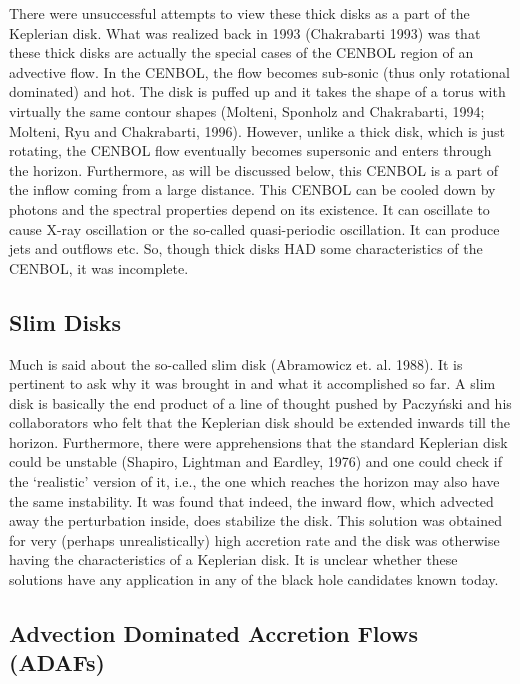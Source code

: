 \documentclass{ws-procs975x65}
\begin{document}
There were unsuccessful attempts to view these thick disks as a part of the Keplerian disk. What was realized
back in 1993 (Chakrabarti 1993) was that these thick disks are actually the special cases of the 
CENBOL region of an advective flow. In the CENBOL, the flow becomes sub-sonic (thus only
rotational dominated) and hot. 
The disk is puffed up and it takes the shape of a torus with virtually the same contour 
shapes (Molteni, Sponholz and Chakrabarti, 1994; Molteni, Ryu and Chakrabarti, 1996). 
However, unlike a thick disk, which is just rotating, the CENBOL flow
eventually becomes supersonic and enters through the horizon.  Furthermore, as will be discussed below,
this CENBOL is a part of the inflow coming from a large distance. This CENBOL can be cooled down by
photons and the spectral properties depend on its existence. It can oscillate to cause X-ray oscillation
or the so-called quasi-periodic oscillation. It can produce jets and outflows etc. So, though thick
disks HAD some characteristics of the CENBOL, it was incomplete. 

\subsection{Slim Disks}

Much is said about the so-called slim disk (Abramowicz et. al. 1988). It is pertinent to ask why it was
brought in and what it accomplished so far. A 
slim disk is basically the end product of a line of thought
pushed by Paczy\'nski and his collaborators who felt that the Keplerian disk should be extended 
inwards till the horizon. Furthermore, there were apprehensions that the standard Keplerian disk 
could be unstable (Shapiro, Lightman and Eardley, 1976) and one could check if the `realistic' version 
of it, i.e., the one which reaches the horizon may also have the same instability. It was found
that indeed, the inward flow, which advected away the perturbation inside, does stabilize the disk.
This solution was obtained for very (perhaps unrealistically) high accretion rate and the 
disk was otherwise having the characteristics of a Keplerian disk. It is unclear whether these
solutions have any application in any of the black hole candidates known today.

\subsection{Advection Dominated Accretion Flows (ADAFs)}
\end{document}
